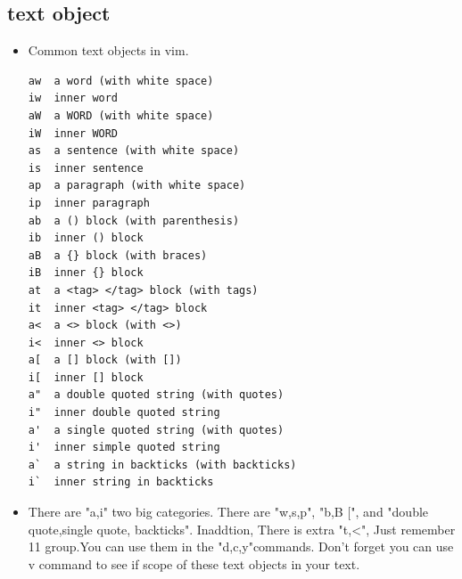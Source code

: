 \documentclass[a4paper,12pt,twoside]{book}
\begin{document}
\subsection{text object}
\begin{itemize}
		\item Common text objects in vim. 
\begin{verbatim}
aw	a word (with white space)
iw	inner word
aW	a WORD (with white space)
iW	inner WORD
as	a sentence (with white space)
is	inner sentence
ap	a paragraph (with white space)
ip	inner paragraph
ab	a () block (with parenthesis)
ib	inner () block
aB	a {} block (with braces)
iB	inner {} block
at	a <tag> </tag> block (with tags)
it	inner <tag> </tag> block
a<	a <> block (with <>)
i<	inner <> block
a[	a [] block (with [])
i[	inner [] block
a"	a double quoted string (with quotes)
i"	inner double quoted string
a'	a single quoted string (with quotes)
i'	inner simple quoted string
a`	a string in backticks (with backticks)
i`	inner string in backticks
\end{verbatim}
\item There are "a,i" two big categories. There are "w,s,p", "b,B $[$", and "double quote,single quote, backticks". Inaddtion, There is extra "t,<", Just remember 11 group.You can use them in the "d,c,y"commands. Don't forget you can use v command to see if scope of these text objects in your text.
				
		\end{itemize}
\end{document}

